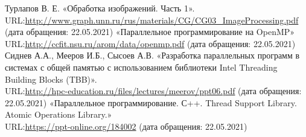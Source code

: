 \documentclass{report}
\begin{document}
\begin{thebibliography}{1}
 Турлапов В. Е. «Обработка изображений. Часть 1».
\\URL:\url {http://www.graph.unn.ru/rus/materials/CG/CG03_ImageProcessing.pdf} (дата обращения: 22.05.2021)
\bibitem{} «Параллельное программирование на OpenMP»
\\URL:\url {http://ccfit.nsu.ru/arom/data/openmp.pdf} (дата обращения: 22.05.2021)
 Сиднев А.А., Мееров И.Б., Сысоев А.В. «Разработка параллельных программ в системах с общей памятью с использованием библиотеки Intel Threading Building Blocks (TBB)».
\\URL:\url {http://hpc-education.ru/files/lectures/meerov/ppt06.pdf} (дата обращения: 22.05.2021)
\bibitem{} «Параллельное программирование. С++. Thread Support Library. Atomic Operations Library.»
\\URL:\url {https://ppt-online.org/184002} (дата обращения: 22.05.2021)
\end{thebibliography}
\newpage

\end{document}

